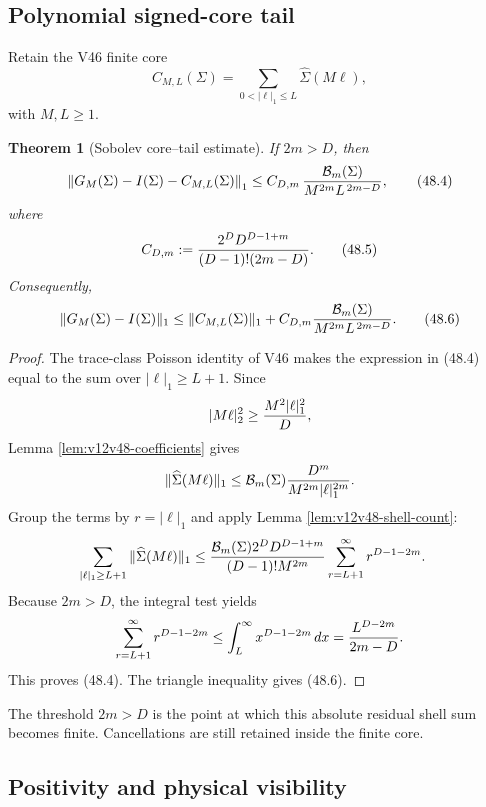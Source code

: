 \documentclass[11pt]{article}
\newtheorem{theorem}{Theorem}[section]
\theoremstyle{remark}
\begin{document}
\subsection{Polynomial signed-core tail}

Retain the V46 finite core
\[
 C_{M,L}(\Sigma)
 =
 \sum_{0<|\ell|_1\leq L}\widehat\Sigma(M\ell),
\]
with \(M,L\geq1\).

\begin{theorem}[Sobolev core--tail estimate]
\label{thm:v12v48-core-tail}
If \(2m>D\), then
\begin{equation}
 \left\|
 G_M(\Sigma)-I(\Sigma)-C_{M,L}(\Sigma)
 \right\|_1
 \leq
 C_{D,m}\,
 {{\cal B}_m(\Sigma)\over
  M^{2m}L^{\,2m-D}},                              \tag{48.4}
\end{equation}
where
\begin{equation}
 C_{D,m}:=
 {2^DD^{D-1+m}\over
  (D-1)!(2m-D)}.                                  \tag{48.5}
\end{equation}
Consequently,
\begin{equation}
 \|G_M(\Sigma)-I(\Sigma)\|_1
 \leq
 \|C_{M,L}(\Sigma)\|_1
 +
 C_{D,m}
 {{\cal B}_m(\Sigma)\over
  M^{2m}L^{\,2m-D}}.                              \tag{48.6}
\end{equation}
\end{theorem}

\begin{proof}
The trace-class Poisson identity of V46 makes the expression in
(48.4) equal to the sum over
\(|\ell|_1\geq L+1\).  Since
\[
 |M\ell|_2^2
 \geq {M^2|\ell|_1^2\over D},
\]
Lemma \ref{lem:v12v48-coefficients} gives
\[
 \|\widehat\Sigma(M\ell)\|_1
 \leq
 {\cal B}_m(\Sigma)
 {D^m\over M^{2m}|\ell|_1^{2m}}.
\]
Group the terms by \(r=|\ell|_1\) and apply Lemma
\ref{lem:v12v48-shell-count}:
\begin{align*}
 \sum_{|\ell|_1\geq L+1}
 \|\widehat\Sigma(M\ell)\|_1
 &\leq
 {{\cal B}_m(\Sigma)2^DD^{D-1+m}\over
   (D-1)!M^{2m}}
 \sum_{r=L+1}^\infty r^{D-1-2m}.
\end{align*}
Because \(2m>D\), the integral test yields
\[
 \sum_{r=L+1}^\infty r^{D-1-2m}
 \leq
 \int_L^\infty x^{D-1-2m}\,dx
 =
 {L^{D-2m}\over2m-D}.
\]
This proves (48.4).  The triangle inequality gives (48.6).
\end{proof}

The threshold \(2m>D\) is the point at which this absolute residual
shell sum becomes finite.  Cancellations are still retained inside
the finite core.

\subsection{Positivity and physical visibility}
\end{document}
